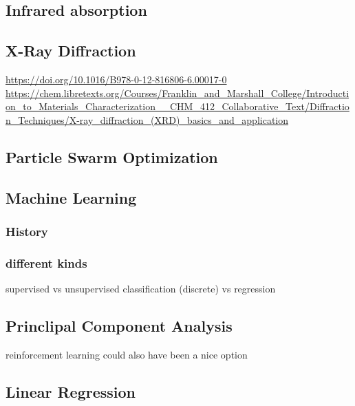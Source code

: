 \subsection{Infrared absorption}
\subsection{X-Ray Diffraction}
\url{https://doi.org/10.1016/B978-0-12-816806-6.00017-0}\\
\url{https://chem.libretexts.org/Courses/Franklin_and_Marshall_College/Introduction_to_Materials_Characterization__CHM_412_Collaborative_Text/Diffraction_Techniques/X-ray_diffraction_(XRD)_basics_and_application}\\
\subsection{Particle Swarm Optimization}
\subsection{Machine Learning}
\subsubsection{History}
\subsubsection{different kinds} 
supervised vs unsupervised
classification (discrete) vs regression
\subsection{Princlipal Component Analysis}
reinforcement learning could also have been a nice option
\subsection{Linear Regression}
